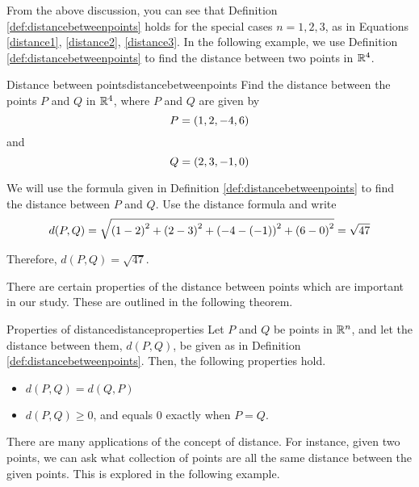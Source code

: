 From the above discussion, you can see that Definition \ref{def:distancebetweenpoints} holds for the special cases $n=1,2,3$, as in 
Equations \ref{distance1}, \ref{distance2}, \ref{distance3}. 
In the following example, we use Definition \ref{def:distancebetweenpoints} to find the distance between two points in
$\mathbb{R}^4$.

\begin{example}{Distance between points}{distancebetweenpoints}
Find the distance between the points $P$ and $Q$ in $\mathbb{R}^{4}$,
where $P$ and $Q$ are given by 
\begin{equation*}
P=\left(1,2,-4,6\right)
\end{equation*}
and
\begin{equation*}
Q=\left(2,3,-1,0\right)
\end{equation*}
\end{example}

\begin{solution}
We will use the formula given in Definition \ref{def:distancebetweenpoints} to find the distance between
$P$ and $Q$. 
Use the distance formula and write
\begin{equation*}
d(P,Q)= \sqrt{ \left(1-2\right) ^{2}+\left(2-3\right)
^{2}+\left(-4-\left(-1\right) \right) ^{2}+\left(6-0\right)^{2}} = \sqrt{47}
\end{equation*}

Therefore, $d( P,Q) =
\sqrt{47}.$

\end{solution}

There are certain properties of the distance between points which are important in our study.
These are outlined in the following theorem.

\begin{theorem}{Properties of distance}{distanceproperties}
Let $P$ and $Q$ be points in $\mathbb{R}^n$, and let the distance between them,
$d( P, Q)$, be given as in Definition \ref{def:distancebetweenpoints}. 
Then, the following properties hold.
\begin{itemize}
\item $ d( P, Q) = d( Q, P)  $
\item $ d( P, Q) \geq 0$, and equals 0 exactly when $P = Q.$
\end{itemize}
\end{theorem}

There are many applications of the concept of distance. For instance,
given two points, we can ask what collection of points are all the
same distance between the given points. This is explored in the
following example.

